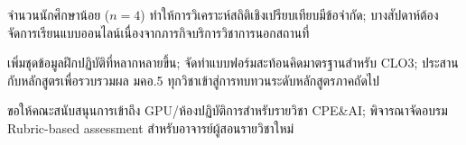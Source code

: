 \documentclass{mko5}
\begin{document}
\mkosectionfour
\begin{mkotextblock}
จำนวนนักศึกษาน้อย ($n=4$) ทำให้การวิเคราะห์สถิติเชิงเปรียบเทียบมีข้อจำกัด;
บางสัปดาห์ต้องจัดการเรียนแบบออนไลน์เนื่องจากภารกิจบริการวิชาการนอกสถานที่
\end{mkotextblock}

\mkosectionfive
\begin{mkotextblock}
เพิ่มชุดข้อมูลฝึกปฏิบัติที่หลากหลายขึ้น; จัดทำแบบฟอร์มสะท้อนคิดมาตรฐานสำหรับ CLO3;
ประสานกับหลักสูตรเพื่อรวบรวมผล มคอ.5 ทุกวิชาเข้าสู่การทบทวนระดับหลักสูตรภาคถัดไป
\end{mkotextblock}

\mkosectionsix
\begin{mkotextblock}
ขอให้คณะสนับสนุนการเข้าถึง GPU/ห้องปฏิบัติการสำหรับรายวิชา CPE\&AI;
พิจารณาจัดอบรม Rubric-based assessment สำหรับอาจารย์ผู้สอนรายวิชาใหม่
\end{mkotextblock}

\mkosectionseven
{}
\end{document}
